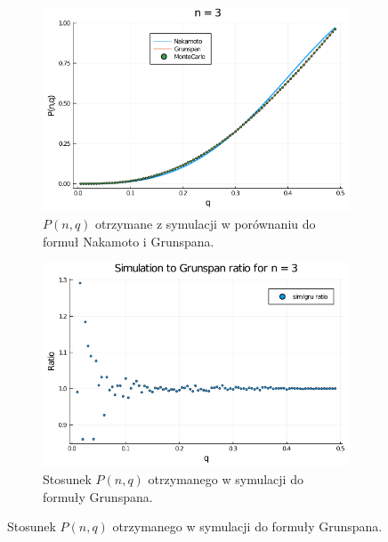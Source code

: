 \documentclass{article}
\begin{document}
        \begin{figure}[H]
            \centering
            \begin{subfigure}{0.65\textwidth}
                \includegraphics[width=\linewidth]{img/mc_n=3.png}
                \caption{$P(n,q)$ otrzymane z symulacji w porównaniu do formuł Nakamoto i Grunspana.}
            \end{subfigure}
    
            \begin{subfigure}{0.65\textwidth}
                \includegraphics[width=\linewidth]{img/mc_to_gr_n=3.png}
                \caption{Stosunek $P(n,q)$ otrzymanego w symulacji do formuły Grunspana.}
            \end{subfigure}
    

\end{figure}
\end{document}
